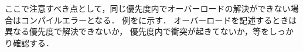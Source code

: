 ここで注意すべき点として，同じ優先度内でオーバーロードの解決ができない場合はコンパイルエラーとなる．
例をに示す．
オーバーロードを記述するときは異なる優先度で解決できないか，
優先度内で衝突が起きてないか，等をしっかり確認する．


